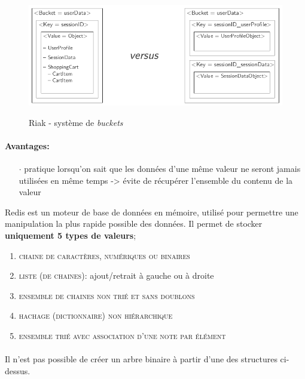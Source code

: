 {\begin{figure}[h!]
\center\includegraphics[scale=.3]{images/riak-bucket}
\label{riak-buckets}
\caption{Riak - système de \textit{buckets} \cite{ref1}}
\end{figure}

\paragraph{Avantages:}
\begin{itemize}
\item[$\cdot$]pratique lorsqu'on sait que les données d'une même valeur ne seront jamais utilisées en même temps -> évite de récupérer l'ensemble du contenu de la valeur
\end{itemize}
}


\item{}
{\faux}
{
Redis est un moteur de base de données en mémoire, utilisé pour permettre une manipulation la plus rapide possible des données. Il permet de stocker \textbf{uniquement 5 types de valeurs};
\begin{enumerate}
\item \textcolor{ltred}{\textsc{chaine de caractères, numériques ou binaires}}
\item \textcolor{ltred}{\textsc{liste (de chaines)}}: ajout/retrait à gauche ou à droite
\item \textcolor{ltred}{\textsc{ensemble de chaines non trié et sans doublons}}
\item \textcolor{ltred}{\textsc{hachage (dictionnaire) non hiérarchique}}
\item \textcolor{ltred}{\textsc{ensemble trié avec association d'une note par élément}}
\end{enumerate}
\paragraph{} 
Il n'est pas possible de créer un arbre binaire à partir d'une des structures ci-dessus.
}


